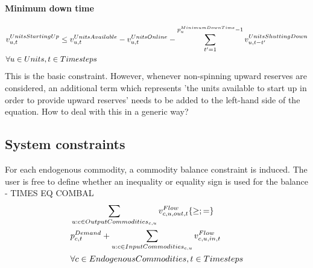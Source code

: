 \paragraph{Minimum down time}
\begin{align} \label{eq:minimumdowntime}
&\vUnitsStartingUp \le \vUnitsAvailable - \vUnitsOnline - \sum_{\timestep'=1}^{\pMinimumDownTime - 1} \vUnitsShuttingDown[\unit,\timestep-\timestep'] \nonumber \\
& \forall \units, \timesteps
\end{align}
{\color{red} This is the basic constraint. However, whenever non-spinning upward reserves are considered, an additional term which represents 'the units available to start up in order to provide upward reserves' needs to be added to the left-hand side of the equation. How to deal with this in a generic way?}






\subsection{System constraints}

For each endogenous commodity, a commodity balance constraint is induced. The user is free to define whether an inequality or equality sign is used for the balance - TIMES EQ COMBAL
\begin{align} \label{eq:commodity_balance}
&\sum_{\unit : \commodity \in \OutputCommodities} \vFlow[\commodity,\unit,out,\timestep] \{\ge;=\} \nonumber \\ 
&\pDemand + \sum_{\unit: \commodity \in \InputCommodities} \vFlow[\commodity,\unit,in,\timestep] \nonumber \\ 
& \forall \EndogenousCommodities, \timesteps 
\end{align}



